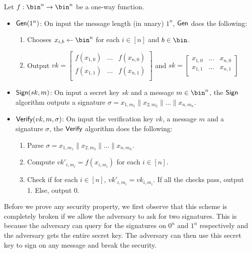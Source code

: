 Let $f: \bin^n \rightarrow \bin^n$ be a one-way function.
\begin{itemize}
\item $\mathsf{Gen}(1^n)$: On input the message length (in unary) $1^n$, $\mathsf{Gen}$ does the following:
\begin{enumerate}
    \item Chooses $x_{i,b} \gets \bin^n$ for each $i \in [n]$ and $b \in \bin$.
    \item Output $vk = \left[ \begin{array}{ccc}
f(x_{1,0}) & \ldots & f(x_{n,0}) \\
f(x_{1,1}) & \ldots & f(x_{n,1}) \\
\end{array} \right]$ and $sk = \left[ \begin{array}{ccc}
x_{1,0} & \ldots & x_{n,0} \\
x_{1,1} & \ldots & x_{n,1} \\
\end{array} \right]$
\end{enumerate}
\item $\mathsf{Sign}(sk, m)$: On input a secret key $sk$ and a message $m \in \bin^n$, the $\mathsf{Sign}$ algorithm outputs a signature $\sigma = x_{1,m_1}\|x_{2,m_2}\| \ldots \| x_{n,m_n}$.
\item $\mathsf{Verify}(vk, m, \sigma)$: On input the verification key $vk$, a message $m$ and a signature $\sigma$, the $\mathsf{Verify}$ algorithm does the following:
\begin{enumerate}
    \item Parse $\sigma = x_{1,m_1}\|x_{2,m_2}\| \ldots \| x_{n,m_n}$.
    \item Compute $vk'_{i,m_i} = f(x_{i,m_i})$ for each $i \in [n]$.
    \item Check if for each $i \in [n]$, $vk'_{i,m_i} = vk_{i,m_i}$. If all the checks pass, output 1. Else, output 0.
\end{enumerate}
\end{itemize}

Before we prove any security property, we first observe that this scheme is completely broken if we allow the adversary to ask for two signatures. This is because the adversary can query for the signatures on $0^n$ and $1^n$ respectively and the adversary gets the entire secret key. The adversary can then use this secret key to sign on any message and break the security. 


